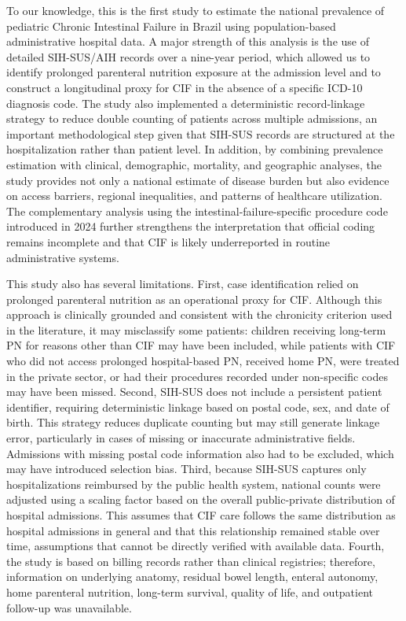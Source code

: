 \documentclass[pdflatex,sn-mathphys-num]{sn-jnl}
\theoremstyle{thmstyleone}%
\theoremstyle{thmstyletwo}%
\theoremstyle{thmstylethree}%
\begin{document}
To our knowledge, this is the first study to estimate the national prevalence of pediatric Chronic Intestinal Failure in Brazil using population-based administrative hospital data. A major strength of this analysis is the use of detailed SIH-SUS/AIH records over a nine-year period, which allowed us to identify prolonged parenteral nutrition exposure at the admission level and to construct a longitudinal proxy for CIF in the absence of a specific ICD-10 diagnosis code. The study also implemented a deterministic record-linkage strategy to reduce double counting of patients across multiple admissions, an important methodological step given that SIH-SUS records are structured at the hospitalization rather than patient level. In addition, by combining prevalence estimation with clinical, demographic, mortality, and geographic analyses, the study provides not only a national estimate of disease burden but also evidence on access barriers, regional inequalities, and patterns of healthcare utilization. The complementary analysis using the intestinal-failure-specific procedure code introduced in 2024 further strengthens the interpretation that official coding remains incomplete and that CIF is likely underreported in routine administrative systems.

This study also has several limitations. First, case identification relied on prolonged parenteral nutrition as an operational proxy for CIF. Although this approach is clinically grounded and consistent with the chronicity criterion used in the literature, it may misclassify some patients: children receiving long-term PN for reasons other than CIF may have been included, while patients with CIF who did not access prolonged hospital-based PN, received home PN, were treated in the private sector, or had their procedures recorded under non-specific codes may have been missed. Second, SIH-SUS does not include a persistent patient identifier, requiring deterministic linkage based on postal code, sex, and date of birth. This strategy reduces duplicate counting but may still generate linkage error, particularly in cases of missing or inaccurate administrative fields. Admissions with missing postal code information also had to be excluded, which may have introduced selection bias. Third, because SIH-SUS captures only hospitalizations reimbursed by the public health system, national counts were adjusted using a scaling factor based on the overall public-private distribution of hospital admissions. This assumes that CIF care follows the same distribution as hospital admissions in general and that this relationship remained stable over time, assumptions that cannot be directly verified with available data. Fourth, the study is based on billing records rather than clinical registries; therefore, information on underlying anatomy, residual bowel length, enteral autonomy, home parenteral nutrition, long-term survival, quality of life, and outpatient follow-up was unavailable.
\end{document}
